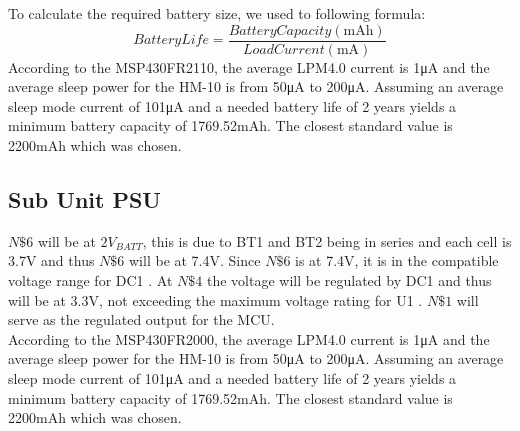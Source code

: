 To calculate the required battery size, we used to following formula:
\begin{equation}
  Battery Life = \frac{Battery Capacity (\si{\milli\ampere\hour})}{Load Current (\si{\milli\ampere})}
  \label{eq:batt-life}
\end{equation}
According to the MSP430FR2110, the average LPM4.0 current is 1\si{\micro\ampere} and the average sleep power for the HM-10 is from 50\si{\micro\ampere} to 200\si{\micro\ampere}. Assuming an average sleep mode current of 101\si{\micro\ampere} and a needed battery life of 2 years yields a minimum battery capacity of 1769.52mAh. The closest standard value is 2200mAh which was chosen.
\subsection{Sub Unit PSU}
$N\$6$ will be at $2V_{BATT}$, this is due to BT1 and BT2 being in series and each cell is 3.7\si{\V} \cite{ICR186502200F} and thus $N\$6$ will be at 7.4\si{\V}. Since $N\$6$ is at 7.4\si{\V}, it is in the compatible voltage range for DC1 \cite{BA033CC0FPE2}. At $N\$4$ the voltage will be regulated by DC1 and thus will be at 3.3\si{\V}, not exceeding the maximum voltage rating for U1 \cite{BA033CC0FPE2}. $N\$1$ will serve as the regulated output for the MCU.\\
According to the MSP430FR2000, the average LPM4.0 current is 1\si{\micro\ampere} and the average sleep power for the HM-10 is from 50\si{\micro\ampere} to 200\si{\micro\ampere}. Assuming an average sleep mode current of 101\si{\micro\ampere} and a needed battery life of 2 years yields a minimum battery capacity of 1769.52mAh. The closest standard value is 2200mAh which was chosen.
